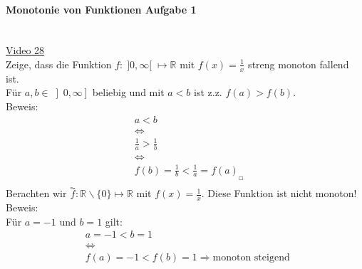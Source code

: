 \paragraph{Monotonie von Funktionen Aufgabe 1}$  $\vspace*{3mm}\\
\href{https://youtu.be/BN9OWtPFY7g}{Video 28}\\
Zeige, dass die Funktion $ f:\;]0,\infty[ \;\longmapsto \mathbb{R}$ mit $ f(x) =\frac{1}{x}$ streng monoton fallend ist.\vspace*{4mm}\\
Für $ a,b\in \left] 0,\infty\right]  $ beliebig und mit $ a<b $ ist z.z. $ f(a)>f(b) $.\\
Beweis:\\
\begin{align*}
&a<b\\
&\Leftrightarrow\\
&\frac{1}{a}>\frac{1}{b}\\
&\Leftrightarrow\\
&f(b)=\frac{1}{b}<\frac{1}{a}=f(a)_{_{\Square}}\\
\end{align*}
Berachten wir $ \overset{\AC}{f}:\mathbb{R}\backslash \{0\}\longmapsto \mathbb{R}  $ mit $ f(x)=\frac{1}{x} $.
Diese Funktion ist nicht monoton!\\
Beweis:\\
Für $ a=-1 $ und $ b=1 $ gilt:\\
\begin{align*}
&a=-1<b=1\\
&\Leftrightarrow\\
&f(a)=-1<f(b)=1\Rightarrow  \text{monoton steigend }\\
\end{align*}
